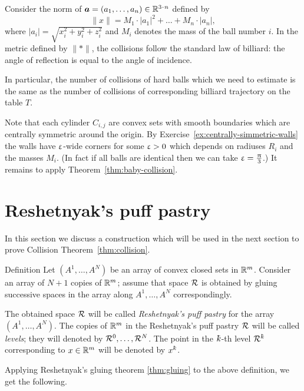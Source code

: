 Consider the norm of $\bm{a}=(a_1,\dots,a_n)\in \RR^{3\cdot n}$ defined by
\[\lVert x\rVert=M_1\cdot|a_1|^2+\dots+M_n\cdot |a_n|,\]
where $|a_i|=\sqrt{x_i^2+y_i^2+z_i^2}$ 
and $M_i$ denotes the mass of the ball number $i$.
In the metric defined by $\lVert {*}\rVert$,
the collisions follow the
standard law of billiard: 
the angle of reflection is equal to the angle
of incidence. 

In particular, the number of collisions of hard balls which we need to estimate 
is the same as the number of collisions of corresponding billiard trajectory on the table $T$.

Note that each cylinder $C_{i,j}$ are convex sets 
with smooth boundaries which 
are centrally symmetric around the origin.
By Exercise~\ref{ex:centrally-simmetric-walls} the walls have $\upvarepsilon$-wide corners for some $\upvarepsilon>0$ which depends on radiuses $R_i$ and the masses $M_i$.
(In fact if all balls are identical then we can take $\upvarepsilon=\tfrac{\uppi}3$.)
It remains to apply Theorem~\ref{thm:baby-collision}.
\qeds

\section{Reshetnyak's puff pastry}

In this section we discuss a construction which will be used in the next section to prove Collision Theorem~\ref{thm:collision}.

\begin{thm}{Definition}
Let $(A^1,\dots,A^N)$ be an array of convex closed sets in $\mathbb{R}^m$.
Consider an array of $N+1$ copies of $\mathbb{R}^m$;
assume that space $\mathcal{R}$ is 
obtained by
gluing successive spaces in the array  
along $A^1,\dots,A^N$ correspondingly.

The obtained space $\mathcal{R}$  will be called \emph{Reshetnyak's puff pastry} for the array $(A^1,\dots,A^N)$.
The copies of $\mathbb{R}^m$ in the Reshetnyak's puff pastry $\mathcal{R}$
will be called \emph{levels};
they will denoted by $\spc{R}^0,\dots,\spc{R}^N$.
The point in the $\kay$-th level $\spc{R}^\kay$
corresponding to $x\in \RR^m$
will be denoted by $x^\kay$.
\end{thm}

Applying Reshetnyak's gluing theorem \ref{thm:gluing}
to the above definition, we get the following.

